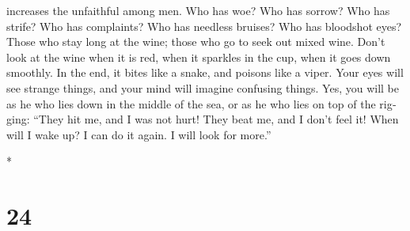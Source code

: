 \begin{paracol}{2}
\begin{otherlanguage}{english}
increases the unfaithful among men.  Who has woe? Who has
sorrow? Who has strife? Who has complaints? Who has needless bruises?
Who has bloodshot eyes?  Those who stay long at the wine;
those who go to seek out mixed wine.  Don't look at the
wine when it is red, when it sparkles in the cup, when it goes down
smoothly.  In the end, it bites like a snake, and poisons
like a viper.  Your eyes will see strange things, and
your mind will imagine confusing things.  Yes, you will
be as he who lies down in the middle of the sea, or as he who lies on
top of the rigging:  ``They hit me, and I was not hurt!
They beat me, and I don't feel it! When will I wake up? I can do it
again. I will look for more.''

\end{otherlanguage}

\switchcolumn[0]*

\hypertarget{section-46}{%
\section{24}\label{section-46}}


\end{paracol}
